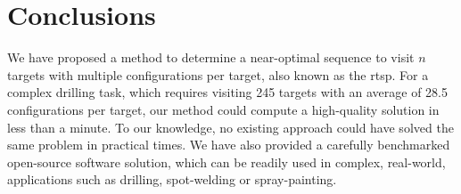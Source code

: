 \section{Conclusions}
\label{sec:conclusions}

We have proposed a method to determine a near-optimal sequence to
visit $n$ targets with multiple configurations per target, also known
as the \acl{rtsp}. For a complex drilling task, which requires
visiting 245 targets with an average of 28.5 configurations per
target, our method could compute a high-quality solution in less than
a minute. To our knowledge, no existing approach could have solved the
same problem in practical times. We have also provided a carefully
benchmarked open-source software solution, which can be readily used
in complex, real-world, applications such as drilling, spot-welding or
spray-painting.

